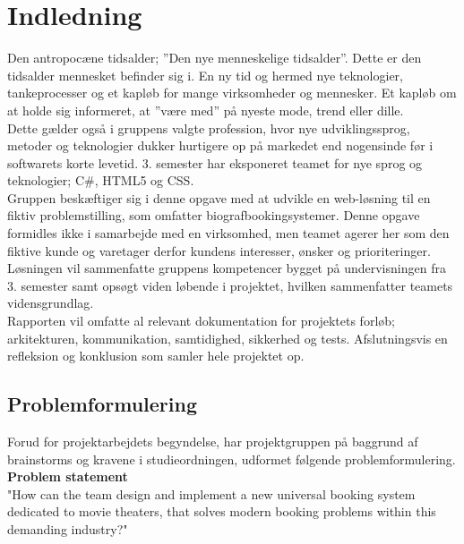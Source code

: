 \chapter{Indledning}\label{ch:indledning}
Den antropocæne tidsalder; ”Den nye menneskelige tidsalder”. Dette er den tidsalder mennesket befinder sig i.
En ny tid og hermed nye teknologier, tankeprocesser og et kapløb for mange virksomheder og mennesker. 
Et kapløb om at holde sig informeret, at ”være med” på nyeste mode, trend eller dille. \\

Dette gælder også i gruppens valgte profession, hvor nye udviklingssprog, metoder og teknologier dukker 
hurtigere op på markedet end nogensinde før i softwarets korte levetid. 3. semester har eksponeret teamet for nye sprog og teknologier; 
C\#, HTML5 og CSS. \\

Gruppen beskæftiger sig i denne opgave med at udvikle en web-løsning til en fiktiv problemstilling,
som omfatter biografbookingsystemer. Denne opgave formidles ikke i samarbejde med en virksomhed, 
men teamet agerer her som den fiktive kunde og varetager derfor kundens interesser, ønsker og prioriteringer. \\

Løsningen vil sammenfatte gruppens kompetencer bygget på undervisningen fra 3. semester samt opsøgt viden løbende i 
projektet, hvilken sammenfatter teamets vidensgrundlag. \\

Rapporten vil omfatte al relevant dokumentation for projektets forløb; arkitekturen, 
kommunikation, samtidighed, sikkerhed og tests. Afslutningsvis en refleksion og konklusion som samler hele projektet op.

\newpage
\section{Problemformulering}\label{sec:problemformulering}
Forud for projektarbejdets begyndelse, har projektgruppen på baggrund af brainstorms og kravene i
studieordningen, udformet følgende problemformulering. \\

\textbf{Problem statement} \\
"How can the team design and implement a new universal booking system dedicated to movie theaters, 
that solves modern booking problems within this demanding industry?" \\

